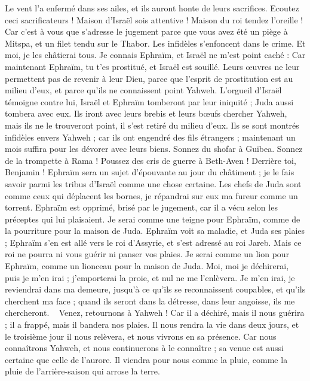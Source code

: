 \begin{multicols}{2}
Le vent l'a enfermé dans ses ailes, et ils auront honte de leurs sacrifices.
\VerseOne{}Ecoutez ceci sacrificateurs ! Maison d'Israël sois attentive ! Maison du roi tendez l'oreille ! Car c'est à vous que s'adresse le jugement parce que vous avez été un piège à Mitspa, et un filet tendu sur le Thabor.
Les infidèles s'enfoncent dans le crime. Et moi, je les châtierai tous.
Je connais Ephraïm, et Israël ne m'est point caché : Car maintenant Ephraïm, tu t'es prostitué, et Israël est souillé.
Leurs œuvres ne leur permettent pas de revenir à leur Dieu, parce que l'esprit de prostitution est au milieu d'eux, et parce qu'ils ne connaissent point Yahweh.
L'orgueil d'Israël témoigne contre lui, Israël et Ephraïm tomberont par leur iniquité ; Juda aussi tombera avec eux.
Ils iront avec leurs brebis et leurs bœufs chercher Yahweh, mais ils ne le trouveront point, il s'est retiré du milieu d'eux.
Ils se sont montrés infidèles envers Yahweh ; car ils ont engendré des fils étrangers ; maintenant un mois suffira pour les dévorer avec leurs biens.
Sonnez du shofar à Guibea. Sonnez de la trompette à Rama ! Poussez des cris de guerre à Beth-Aven ! Derrière toi, Benjamin !
Ephraïm sera un sujet d'épouvante au jour du châtiment ; je le fais savoir parmi les tribus d'Israël comme une chose certaine.
Les chefs de Juda sont comme ceux qui déplacent les bornes, je répandrai sur eux ma fureur comme un torrent.
Ephraïm est opprimé, brisé par le jugement, car il a vécu selon les préceptes qui lui plaisaient.
Je serai comme une teigne pour Ephraïm, comme de la pourriture pour la maison de Juda.
Ephraïm voit sa maladie, et Juda ses plaies ; Ephraïm s'en est allé vers le roi d'Assyrie, et s'est adressé au roi Jareb. Mais ce roi ne pourra ni vous guérir ni panser vos plaies.
Je serai comme un lion pour Ephraïm, comme un lionceau pour la maison de Juda. Moi, moi je déchirerai, puis je m'en irai ; j'emporterai la proie, et nul ne me l'enlèvera.
Je m'en irai, je reviendrai dans ma demeure, jusqu'à ce qu'ils se reconnaissent coupables, et qu'ils cherchent ma face ; quand ils seront dans la détresse, dans leur angoisse, ils me chercheront.
\
\VerseOne{}Venez, retournons à Yahweh ! Car il a déchiré, mais il nous guérira ; il a frappé, mais il bandera nos plaies.
\VS{2}Il nous rendra la vie dans deux jours, et le troisième jour il nous relèvera, et nous vivrons en sa présence.
\VS{3}Car nous connaîtrons Yahweh, et nous continuerons à le connaître ; sa venue est aussi certaine que celle de l'aurore. Il viendra pour nous comme la pluie, comme la pluie de l'arrière-saison qui arrose la terre.

\end{multicols}
